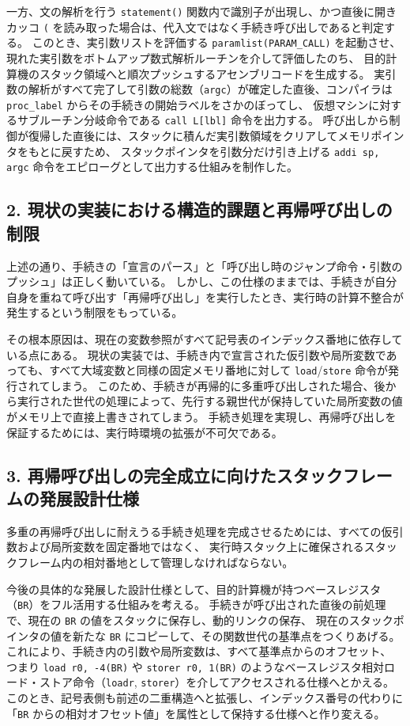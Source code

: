 \documentclass[11pt,a4paper,dvipdfmx]{bxjsarticle}
\begin{document}
一方、文の解析を行う \texttt{statement()} 関数内で識別子が出現し、かつ直後に開きカッコ \texttt{(} を読み取った場合は、代入文ではなく手続き呼び出しであると判定する。
このとき、実引数リストを評価する \texttt{paramlist(PARAM\_CALL)} を起動させ、現れた実引数をボトムアップ数式解析ルーチンを介して評価したのち、
目的計算機のスタック領域へと順次プッシュするアセンブリコードを生成する。
実引数の解析がすべて完了して引数の総数（\texttt{argc}）が確定した直後、コンパイラは \texttt{proc\_label} からその手続きの開始ラベルをさかのぼってし、
仮想マシンに対するサブルーチン分岐命令である \texttt{call L[lbl]} 命令を出力する。
呼び出しから制御が復帰した直後には、スタックに積んだ実引数領域をクリアしてメモリポインタをもとに戻すため、
スタックポインタを引数分だけ引き上げる \texttt{addi sp, argc} 命令をエピローグとして出力する仕組みを制作した。

\subsection*{2. 現状の実装における構造的課題と再帰呼び出しの制限}
上述の通り、手続きの「宣言のパース」と「呼び出し時のジャンプ命令・引数のプッシュ」は正しく動いている。
しかし、この仕様のままでは、手続きが自分自身を重ねて呼び出す「再帰呼び出し」を実行したとき、実行時の計算不整合が発生するという制限をもっている。

その根本原因は、現在の変数参照がすべて記号表のインデックス番地に依存している点にある。
現状の実装では、手続き内で宣言された仮引数や局所変数であっても、すべて大域変数と同様の固定メモリ番地に対して \texttt{load}/\texttt{store} 命令が発行されてしまう。
このため、手続きが再帰的に多重呼び出しされた場合、後から実行された世代の処理によって、先行する親世代が保持していた局所変数の値がメモリ上で直接上書きされてしまう。
手続き処理を実現し、再帰呼び出しを保証するためには、実行時環境の拡張が不可欠である。

\subsection*{3. 再帰呼び出しの完全成立に向けたスタックフレームの発展設計仕様}
多重の再帰呼び出しに耐えうる手続き処理を完成させるためには、すべての仮引数および局所変数を固定番地ではなく、
実行時スタック上に確保されるスタックフレーム内の相対番地として管理しなければならない。

今後の具体的な発展した設計仕様として、目的計算機が持つベースレジスタ（\texttt{BR}）をフル活用する仕組みを考える。
手続きが呼び出された直後の前処理で、現在の \texttt{BR} の値をスタックに保存し、動的リンクの保存、
現在のスタックポインタの値を新たな \texttt{BR} にコピーして、その関数世代の基準点をつくりあげる。
これにより、手続き内の引数や局所変数は、すべて基準点からのオフセット、
つまり \texttt{load r0, -4(BR)} や \texttt{storer r0, 1(BR)} のようなベースレジスタ相対ロード・ストア命令（\texttt{loadr}, \texttt{storer}）を介してアクセスされる仕様へとかえる。
このとき、記号表側も前述の二重構造へと拡張し、インデックス番号の代わりに「\texttt{BR} からの相対オフセット値」を属性として保持する仕様へと作り変える。
\end{document}
